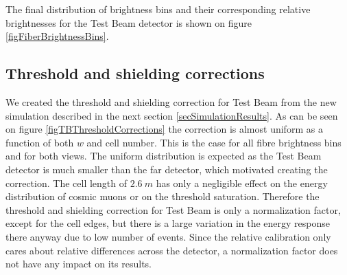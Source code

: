 \documentclass[12pt,a4paper]{article}
\begin{document}
The final distribution of brightness bins and their corresponding relative brightnesses for the Test Beam detector is shown on figure \ref{figFiberBrightnessBins}.

\subsection{Threshold and shielding corrections}
We created the threshold and shielding correction for Test Beam from the new simulation described in the next section \ref{secSimulationResults}. As can be seen on figure \ref{figTBThresholdCorrections} the correction is almost uniform as a function of both $w$ and cell number. This is the case for all fibre brightness bins and for both views. The uniform distribution is expected as the Test Beam detector is much smaller than the far detector, which motivated creating the correction. The cell length of $2.6\ \unit{m}$ has only a negligible effect on the energy distribution of cosmic muons or on the threshold saturation. Therefore the threshold and shielding correction for Test Beam is only a normalization factor, except for the cell edges, but there is a large variation in the energy response there anyway due to low number of events. Since the relative calibration only cares about relative differences across the detector, a normalization factor does not have any impact on its results.
\end{document}
